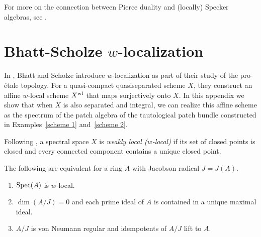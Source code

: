 \documentclass[11pt]{amsart}
\begin{document}
For more on the connection between Pierce duality and (locally) Specker algebras, see \cite{BMO}.


\section[Bhatt-Scholze w-localization]{Bhatt-Scholze $w$-localization}\label{sec: w localization}

In \cite{BhattScholze}, Bhatt and Scholze introduce $w$-localization as part of their study of the pro-\'etale topology. For a quasi-compact quasiseparated scheme $X$, they construct   an affine $w$-local scheme $X^{\rm wl}$ that maps surjectively onto $X$. In this appendix we show that when $X$ is also separated and integral, we can realize this affine scheme as the spectrum of the patch algebra of the tautological patch bundle constructed in Examples~\ref{scheme 1} and~\ref{scheme 2}.

Following \cite{BhattScholze}, a spectral space $X$ is {\it weakly local ($w$-local)} if its set of closed points is closed and every connected component contains a unique closed point. 


\begin{lemma}\label{semiregular} The following are equivalent for a ring $A$ with Jacobson radical $J=J(A)$. 
\begin{enumerate}[label=\textup{(\arabic{*})}, mode=unboxed]
\item\label{semiregular 1} $\mbox{\rm Spec}(A)$ is $w$-local.

\item\label{semiregular 2} $\dim(A/J) = 0$ and each prime ideal of $A$ is contained in a unique maximal ideal.  

\item\label{semiregular 3} $A/J$ is von Neumann regular and idempotents of $A/J$ lift to $A$. 
\end{enumerate}
\end{lemma}
\end{document}
